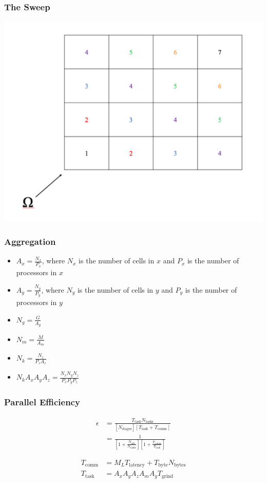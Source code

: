 \documentclass[]{beamer}
\begin{document}
\begin{frame}[t]\frametitle{The Sweep}
\includegraphics[scale = 0.34]{figures/StructuredMesh.pdf}
\end{frame}

\begin{frame}[t]\frametitle{Aggregation}
\begin{block}{}
		\begin{itemize}
		\item $A_x = \frac{N_x}{P_x}$, where $N_x$ is the number of cells in $x$ and $P_x$ is the number of processors in $x$
		\item $A_y = \frac{N_y}{P_y}$, where $N_y$ is the number of cells in $y$ and $P_y$ is the number of processors in $y$
		\item $N_g = \frac{G}{A_g}$
		\item $N_m = \frac{M}{A_m}$
		\item $N_k = \frac{N_z}{P_z A_z}$
		\item $N_k A_x A_y A_z = \frac{N_x N_y N_z}{P_x P_y P_z}$
		\end{itemize}
	\end{block}
\end{frame}

\begin{frame}[t]\frametitle{Parallel Efficiency}
\begin{block}{}
\begin{align*}
\epsilon &= \frac{T_{\text{task}} N_{\text{tasks}}}{[N_{\text{stages}}] [T_{\text{task}} + T_{\text{comm}}]} \\
 &=\frac{1}{[1+\frac{N_{\text{idle}}}{N_{\text{tasks}}}][1 + \frac{T_{\text{comm}}}{T_{\text{task}}}]}
\end{align*}
\end{block}
\begin{block}{}
\begin{align*}
T_{\text{comm}} &= M_L T_{\text{latency}} + T_{\text{byte}} N_{\text{bytes}} \\
T_{\text{task}} &= A_x A_y A_z A_m A_g T_{\text{grind}}
\end{align*}
\end{block}
\end{frame}
\end{document}
